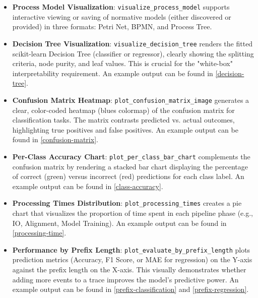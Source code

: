 \documentclass[12pt,a4paper]{article}
\newcommand{\newcov}[1]{\colorbox{green!40}{\textbf{#1}}}
\begin{document}
\begin{itemize}
    \item \textbf{Process Model Visualization}: \texttt{visualize\_process\_model} supports interactive viewing or saving of normative models (either discovered or provided) in three formats: Petri Net, BPMN, and Process Tree.
    \item \textbf{Decision Tree Visualization}: \texttt{visualize\_decision\_tree} renders the fitted scikit-learn Decision Tree (classifier or regressor), clearly showing the splitting criteria, node purity, and leaf values. This is crucial for the "white-box" interpretability requirement. An example output can be found in \ref{decision-tree}.
    \item \textbf{Confusion Matrix Heatmap}: \texttt{plot\_confusion\_matrix\_image} generates a clear, color-coded heatmap (blues colormap) of the confusion matrix for classification tasks. The matrix contrasts predicted vs. actual outcomes, highlighting true positives and false positives. An example output can be found in \ref{confusion-matrix}.
    \item \textbf{Per-Class Accuracy Chart}: \texttt{plot\_per\_class\_bar\_chart} complements the confusion matrix by rendering a stacked bar chart displaying the percentage of correct (green) versus incorrect (red) predictions for each class label. An example output can be found in \ref{class-accuracy}.
    \item \newcov{Processing Times Distribution}: \texttt{plot\_processing\_times} creates a pie chart that visualizes the proportion of time spent in each pipeline phase (e.g., IO, Alignment, Model Training). An example output can be found in \ref{processing-time}.
    \item \newcov{Performance by Prefix Length}: \texttt{plot\_evaluate\_by\_prefix\_length} plots prediction metrics (Accuracy, F1 Score, or MAE for regression) on the Y-axis against the prefix length on the X-axis. This visually demonstrates whether adding more events to a trace improves the model's predictive power. An example output can be found in \ref{prefix-classification} and \ref{prefix-regression}.
\end{itemize}
\end{document}
